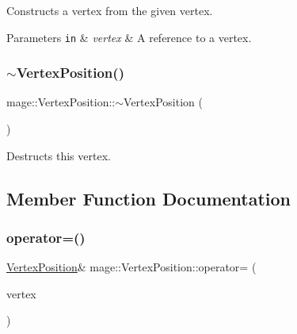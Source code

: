 Constructs a vertex from the given vertex.


\begin{DoxyParams}[1]{Parameters}
\mbox{\tt in}  & {\em vertex} & A reference to a vertex. \\
\hline
\end{DoxyParams}
\hypertarget{structmage_1_1_vertex_position_ae78ac5fd76f3217ec72435beaa34ed6e}{}\label{structmage_1_1_vertex_position_ae78ac5fd76f3217ec72435beaa34ed6e} 
\subsubsection{\texorpdfstring{$\sim$\+Vertex\+Position()}{~VertexPosition()}}
{\footnotesize\ttfamily mage\+::\+Vertex\+Position\+::$\sim$\+Vertex\+Position (\begin{DoxyParamCaption}{ }\end{DoxyParamCaption})\hspace{0.3cm}{\ttfamily [default]}}

Destructs this vertex. 

\subsection{Member Function Documentation}
\hypertarget{structmage_1_1_vertex_position_a07e7df87f6f70556d98c856a47643b73}{}\label{structmage_1_1_vertex_position_a07e7df87f6f70556d98c856a47643b73} 
\subsubsection{\texorpdfstring{operator=()}{operator=()}\hspace{0.1cm}{\footnotesize\ttfamily [1/2]}}
{\footnotesize\ttfamily \hyperlink{structmage_1_1_vertex_position}{Vertex\+Position}\& mage\+::\+Vertex\+Position\+::operator= (\begin{DoxyParamCaption}\item[{const \hyperlink{structmage_1_1_vertex_position}{Vertex\+Position} \&}]{vertex }\end{DoxyParamCaption})\hspace{0.3cm}{\ttfamily [default]}}

